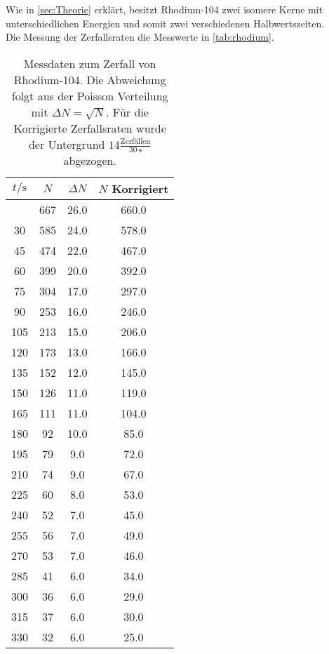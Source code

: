 Wie in \autoref{sec:Theorie} erklärt, besitzt Rhodium-104 zwei isomere Kerne mit unterschiedlichen 
Energien und somit zwei verschiedenen Halbwertszeiten.
\\
Die Messung der Zerfallsraten  die Messwerte in \autoref{tab:rhodium}.
\begin{longtable}{c c c c}
	\caption{Messdaten zum Zerfall von Rhodium-104. Die Abweichung folgt aus der Poisson Verteilung
		mit $\Delta N = \sqrt{N}$. Für die Korrigierte Zerfallsraten wurde der Untergrund 
	$14 \frac{\text{Zerfällen}}{\SI{30}{\second}}$ abgezogen.} \label{tab:rhodium} \\
		\hline
		$t / \si{\second}$ & $N$ & $\Delta N$ &$N$ Korrigiert \\
		\hline
		\endhead
		\hline
		\endfoot
		15  	& 667  	& 26.0         	& 660.0 \\
		 30  	& 585  	& 24.0         	& 578.0 \\
		 45  	& 474  	& 22.0         	& 467.0 \\
		 60  	& 399  	& 20.0         	& 392.0 \\
		 75  	& 304  	& 17.0         	& 297.0 \\
		 90  	& 253  	& 16.0         	& 246.0 \\
		105  	& 213  	& 15.0         	& 206.0 \\
		120  	& 173  	& 13.0         	& 166.0 \\
		135  	& 152  	& 12.0         	& 145.0 \\
		150  	& 126  	& 11.0         	& 119.0 \\
		165  	& 111  	& 11.0         	& 104.0 \\
		180  	&  92  	& 10.0         	&  85.0 \\
		195  	&  79  	&  9.0         	&  72.0 \\
		210  	&  74  	&  9.0         	&  67.0 \\
		225  	&  60  	&  8.0         	&  53.0 \\
		240  	&  52  	&  7.0         	&  45.0 \\
		255  	&  56  	&  7.0         	&  49.0 \\
		270  	&  53  	&  7.0         	&  46.0 \\
		285  	&  41  	&  6.0         	&  34.0 \\
		300  	&  36  	&  6.0         	&  29.0 \\
		315  	&  37  	&  6.0         	&  30.0 \\
		330  	&  32  	&  6.0         	&  25.0 \\

\end{longtable}
